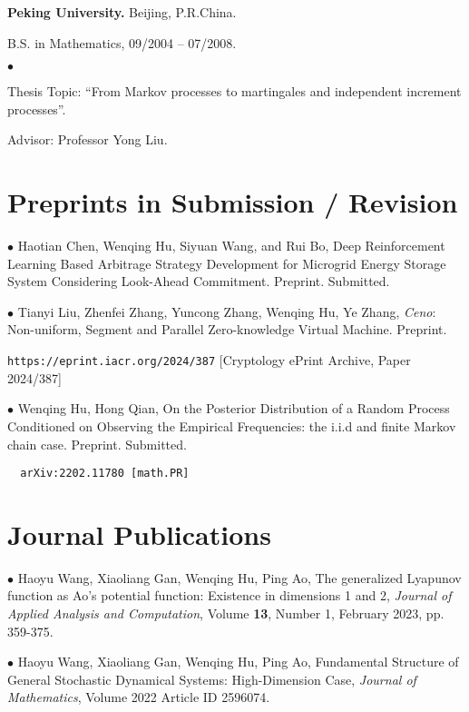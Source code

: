 \documentclass[margin,line]{res}
\newenvironment{list2}{
  \begin{list}{$\bullet$}{%
      \setlength{\itemsep}{0in}
      \setlength{\parsep}{0in} \setlength{\parskip}{0in}
      \setlength{\topsep}{0in} \setlength{\partopsep}{0in}
      \setlength{\leftmargin}{0.2in}}}{\end{list}}
\begin{document}
\begin{resume}
{\bf Peking University.} \hfill Beijing, P.R.China. \\
\vspace*{-.25in}

B.S. in Mathematics, \hfill 09/2004 -- 07/2008.

\begin{list2}
\vspace*{.05in}
\item[] Thesis Topic: ``From Markov processes to martingales and independent
increment processes''.
\item[] Advisor: Professor Yong Liu.
\end{list2}



\section{\sc Preprints in Submission /  Revision}

$\bullet$ Haotian Chen, Wenqing Hu, Siyuan Wang, and Rui Bo, Deep Reinforcement Learning Based Arbitrage
Strategy Development for Microgrid Energy Storage System Considering Look-Ahead Commitment. Preprint. Submitted.

$\bullet$ Tianyi Liu, Zhenfei Zhang, Yuncong Zhang, Wenqing Hu, Ye Zhang, \textit{Ceno}: Non-uniform, Segment and Parallel Zero-knowledge Virtual Machine. Preprint. 

\verb"https://eprint.iacr.org/2024/387" [Cryptology ePrint Archive, Paper 2024/387]

$\bullet$ Wenqing Hu, Hong Qian, On the Posterior Distribution of a Random Process Conditioned on Observing the Empirical Frequencies: the i.i.d and finite Markov chain case. Preprint. Submitted.

\verb"	arXiv:2202.11780 [math.PR]"


\section{\sc Journal Publications}

$\bullet$ Haoyu Wang, Xiaoliang Gan, Wenqing Hu, Ping Ao, The generalized Lyapunov function as Ao's potential function: Existence in dimensions 1 and 2, \textit{Journal of Applied Analysis and Computation}, Volume \textbf{13}, Number 1, February 2023, pp. 359-375. 


$\bullet$ Haoyu Wang, Xiaoliang Gan, Wenqing Hu, Ping Ao,  Fundamental Structure of General Stochastic Dynamical Systems: High-Dimension Case, \textit{Journal of Mathematics}, Volume 2022 Article ID 2596074.


\end{resume}
\end{document}
